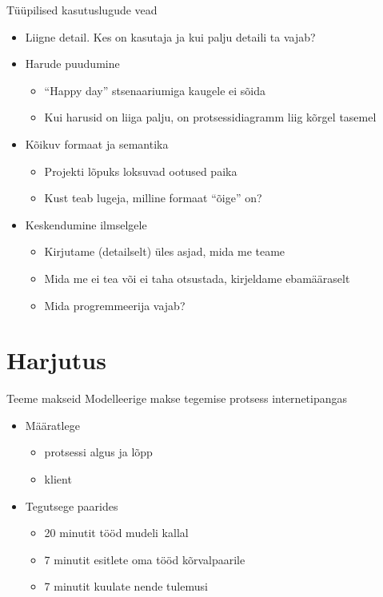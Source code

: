 \documentclass{beamer}
\begin{document}
\begin{frame}{Tüüpilised kasutuslugude vead}
		\begin{itemize}
			\item Liigne detail. Kes on kasutaja ja kui palju detaili ta vajab?
			\item Harude puudumine
			\begin{itemize}
				\item \enquote{Happy day} stsenaariumiga kaugele ei sõida
				\item Kui harusid on liiga palju, on protsessidiagramm liig kõrgel tasemel
			\end{itemize}
			\item Kõikuv formaat ja semantika
			\begin{itemize}
				\item Projekti lõpuks loksuvad ootused paika
				\item Kust teab lugeja, milline formaat \enquote{õige} on?
			\end{itemize}
			\item Keskendumine ilmselgele
			\begin{itemize}
				\item Kirjutame (detailselt) üles asjad, mida me teame
				\item Mida me ei tea või ei taha otsustada, kirjeldame ebamääraselt
				\item Mida progremmeerija vajab?
			\end{itemize}
		\end{itemize}

\end{frame}


\section{Harjutus}

\begin{frame}{Teeme makseid}
Modelleerige makse tegemise protsess internetipangas
\begin{itemize}
	\item Määratlege 
		\begin{itemize}
			\item protsessi algus ja lõpp
			\item klient
		\end{itemize}
	\item Tegutsege paarides
	\begin{itemize}
		\item 20 minutit tööd mudeli kallal
		\item 7 minutit esitlete oma tööd kõrvalpaarile
		\item 7 minutit kuulate nende tulemusi
	\end{itemize}
\end{itemize}
\end{frame}
\end{document}
